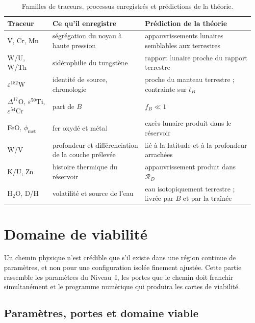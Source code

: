 \documentclass[11pt,a4paper,openany]{report}
\newcommand{\RD}{\mathcal{R}_{D}}
\begin{document}
\begin{table}[htbp]
\centering
\small
\caption{Familles de traceurs, processus enregistrés et prédictions de la théorie.}
\label{tab:traceurs}
\begin{tabularx}{\textwidth}{>{\raggedright\arraybackslash}p{2.6cm}
>{\raggedright\arraybackslash}X >{\raggedright\arraybackslash}X}
\toprule
\textbf{Traceur} & \textbf{Ce qu'il enregistre} & \textbf{Prédiction de la théorie} \\
\midrule
V, Cr, Mn & ségrégation du noyau à haute pression & appauvrissements lunaires semblables aux terrestres \\
W/U, W/Th & sidérophilie du tungstène & rapport lunaire proche du rapport terrestre \\
$\varepsilon^{182}$W & identité de source, chronologie & proche du manteau terrestre ; contrainte sur $t_B$ \\
$\Delta^{17}$O, $\varepsilon^{50}$Ti, $\varepsilon^{54}$Cr & part de $B$ & $f_B\ll1$ \\
FeO, $\phi_{\mathrm{met}}$ & fer oxydé et métal & excès lunaire produit dans le réservoir \\
W/V & profondeur et différenciation de la couche prélevée & lié à la latitude et à la profondeur arrachées \\
K/U, Zn & histoire thermique du réservoir & appauvrissement produit dans $\RD$ \\
H$_2$O, D/H & volatilité et source de l'eau & eau isotopiquement terrestre ; livrée par $B$ et par la traînée \\
\bottomrule
\end{tabularx}
\end{table}
\part{Domaine de viabilité}
\label{part:viabilite}

\noindent
Un chemin physique n'est crédible que s'il existe dans une région continue de paramètres, et non
pour une configuration isolée finement ajustée. Cette partie rassemble les paramètres du
Niveau~I, les portes que le chemin doit franchir simultanément et le programme numérique qui
produira les cartes de viabilité.

\chapter{Paramètres, portes et domaine viable}
\label{ch:portes}
\end{document}
